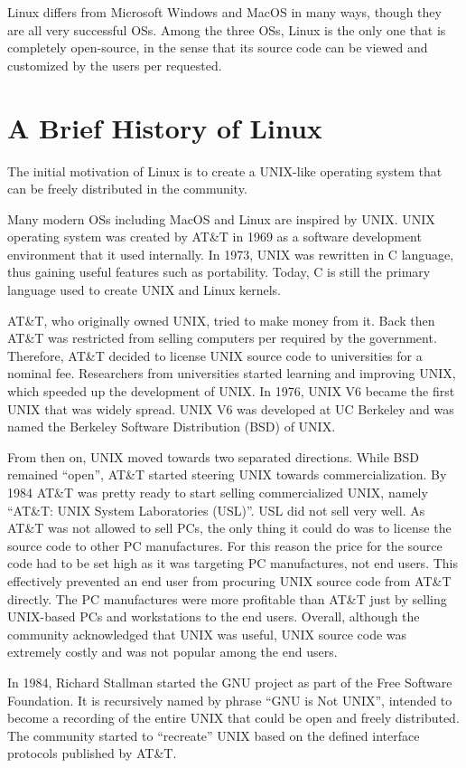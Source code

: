 Linux differs from Microsoft Windows and MacOS in many ways, though they are all very successful OSs. Among the three OSs, Linux is the only one that is completely open-source, in the sense that its source code can be viewed and customized by the users per requested.

\section{A Brief History of Linux}

The initial motivation of Linux is to create a UNIX-like operating system that can be freely distributed in the community.

Many modern OSs including MacOS and Linux are inspired by UNIX. UNIX operating system was created by AT\&T in 1969 as a software development environment that it used internally. In 1973, UNIX was rewritten in C language, thus gaining useful features such as portability. Today, C is still the primary language used to create UNIX and Linux kernels.

AT\&T, who originally owned UNIX, tried to make money from it. Back then AT\&T was restricted from selling computers per required by the government. Therefore, AT\&T decided to license UNIX source code to universities for a nominal fee. Researchers from universities started learning and improving UNIX, which speeded up the development of UNIX. In 1976, UNIX V6 became the first UNIX that was widely spread. UNIX V6 was developed at UC Berkeley and was named the Berkeley Software Distribution (BSD) of UNIX.

From then on, UNIX moved towards two separated directions. While BSD remained ``open'', AT\&T started steering UNIX towards commercialization. By 1984 AT\&T was pretty ready to start selling commercialized UNIX, namely ``AT\&T: UNIX System Laboratories (USL)''. USL did not sell very well. As AT\&T was not allowed to sell PCs, the only thing it could do was to license the source code to other PC manufactures. For this reason the price for the source code had to be set high as it was targeting PC manufactures, not end users. This effectively prevented an end user from procuring UNIX source code from AT\&T directly. The PC manufactures were more profitable than AT\&T just by selling UNIX-based PCs and workstations to the end users. Overall, although the community acknowledged that UNIX was useful, UNIX source code was extremely costly and was not popular among the end users.

In 1984, Richard Stallman started the GNU project as part of the Free Software Foundation. It is recursively named by phrase ``GNU is Not UNIX'', intended to become a recording of the entire UNIX that could be open and freely distributed. The community started to ``recreate'' UNIX based on the defined interface protocols published by AT\&T.

